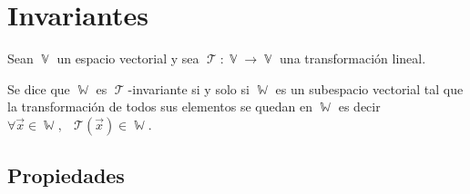 \documentclass[12pt, fleqn]{report}                             %
\DeclareMathOperator \Space     {\quad}                         %
\DeclareMathOperator \MiniSpace {\;}                            %
\theoremstyle{break}                                            %
\DeclareMathOperator \VectorSet    {\mathbb{V}}                 %
\DeclareMathOperator \SubVectorSet {\mathbb{W}}                 %
\DeclareMathOperator \LinTrans      {\mathcal{T}}               %
\newcommand{\Wrap}[1]           {\left( #1 \right)}             %
\newcommand{\FnLinTrans}[1]{\mathcal{T}\Wrap{#1}}               %
\begin{document}
        \vspace{1em}
        \section{Invariantes}
            
            Sean $\VectorSet$ un espacio vectorial y sea $\LinTrans: \VectorSet \to \VectorSet$
            una transformación lineal.

            Se dice que $\SubVectorSet$ es $\LinTrans$-invariante si y solo si $\SubVectorSet$ es
            un subespacio vectorial tal que la transformación de todos sus elementos se quedan en $\SubVectorSet$
            es decir $\forall \vec x \in \SubVectorSet, \MiniSpace \FnLinTrans{\vec x} \in \SubVectorSet$.



            \vspace{1em}
            \subsection{Propiedades}
\end{document}
